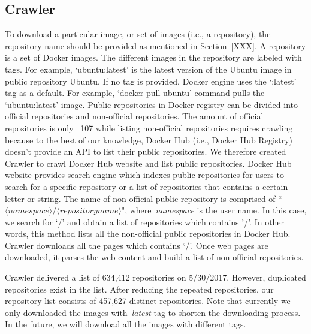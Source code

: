 \subsection{Crawler}
%
To download a particular image, or set of images (i.e., a repository), the repository name should be provided as mentioned in Section~\ref{XXX}. 
%
A repository is a set of Docker images. The different images in the repository are labeled with tags.
%
For example, `ubuntu:latest' is the latest version of the Ubuntu image in public repository Ubuntu.
%
If no tag is provided, Docker engine uses the `:latest' tag as a default. For example, `docker pull ubuntu' command pulls the `ubuntu:latest' image.
%
%
Public repositories in Docker registry can be divided into official repositories and non-official repositories.
%
%
The amount of official repositories is only ~107 while listing non-official repositories requires crawling because to the best of our knowledge, Docker Hub (i.e., Docker Hub Registry) doesn't provide an API to list their public repositories.
%
We therefore created Crawler to crawl Docker Hub website and list public repositories.
%
Docker Hub website provides search engine which indexes public repositories for users to search for a specific repository or a list of repositories that contains a certain letter or string. 
%
The name of non-official public repository is comprised of ``$\langle namespace\rangle/\langle repository name \rangle $", where~\textit{namespace} is the user name. 
%
In this case, we search for `/' and obtain a list of repositories which contains '/'.
%
In other words, this method lists all the non-official public repositories in Docker Hub.
%
Crawler downloads all the pages which contains `/'.
%
Once web pages are downloaded, it parses the web content and build a list of non-official repositories. 



Crawler delivered a list of 634,412 repositories on 5/30/2017.
%
However, duplicated repositories exist in the list.
%
After reducing the repeated repositories, our repository list consists of 457,627 distinct repositories. 
%
Note that currently we only downloaded the images with~\textit{latest} tag to shorten the downloading process. 
%
In the future, we will download all the images with different tags.
%
%
%
